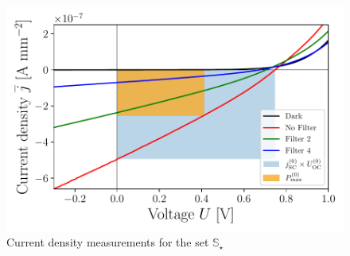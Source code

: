 \documentclass[a4paper,10pt,twocolumn]{article}
\begin{document}
\begin{extract*}
\begin{figure}[H]\centering
	\includegraphics[width=\columnwidth]{../../../IV-Curve-Analysis/OSCPGraph.pdf}
	\caption{Current density measurements for the set $\mathbb{S}_\star$}
	\label{fig:OSCstarGraph}
\end{figure}

\end{extract*}
\end{document}
